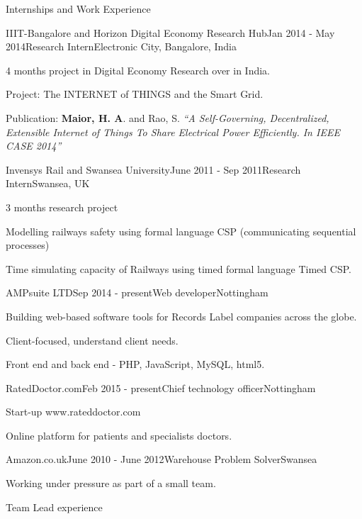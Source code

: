 \documentclass{resume} %
\begin{document}
\begin{rSection}{Internships and Work Experience}

\begin{rSubsection}{IIIT-Bangalore and Horizon Digital Economy Research Hub}{Jan 2014 - May 2014}{Research Intern}{Electronic City, Bangalore, India}
\item 4 months project in Digital Economy Research over in India.
\item Project: The INTERNET of THINGS and the Smart Grid.
\item Publication: \textbf{Maior, H. A}. and Rao, S.  \emph{``A Self-Governing, Decentralized, Extensible Internet of Things To Share Electrical Power Efficiently. In IEEE CASE 2014''}
\end{rSubsection}


\begin{rSubsection}{Invensys Rail and Swansea University}{June 2011 - Sep 2011}{Research Intern}{Swansea, UK}
\item 3 months research project
\item Modelling railways safety using formal language CSP (communicating sequential processes)
\item Time simulating capacity of Railways using timed formal language Timed CSP.
\end{rSubsection}


  \begin{rSubsection}{AMPsuite LTD}{Sep 2014 - present}{Web developer}{Nottingham}
        \item Building web-based software tools for Records Label companies across the globe.
        \item Client-focused, understand client needs.
        \item Front end and back end - PHP, JavaScript, MySQL, html5.
    \end{rSubsection}

    \begin{rSubsection}{RatedDoctor.com}{Feb 2015 - present}{Chief technology officer}{Nottingham}
        \item Start-up www.rateddoctor.com
        \item Online platform for patients and specialists doctors.
    \end{rSubsection}

    \begin{rSubsection}{Amazon.co.uk}{June 2010 - June 2012}{Warehouse Problem Solver}{Swansea}
        \item Working under pressure as part of a small team.
        \item Team Lead experience
\end{rSubsection}

\end{rSection}
\end{document}
